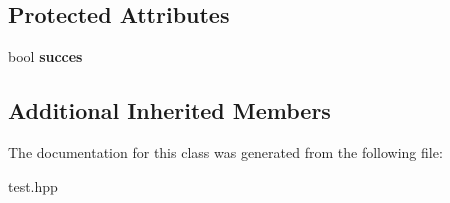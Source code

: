\subsection*{Protected Attributes}
\begin{DoxyCompactItemize}
\item 
\mbox{\label{classtest_add09dbfbbd6c5fe5ecb2d50f4ff51b23}} 
bool {\bfseries succes}
\end{DoxyCompactItemize}
\subsection*{Additional Inherited Members}


The documentation for this class was generated from the following file\+:\begin{DoxyCompactItemize}
\item 
test.\+hpp\end{DoxyCompactItemize}
